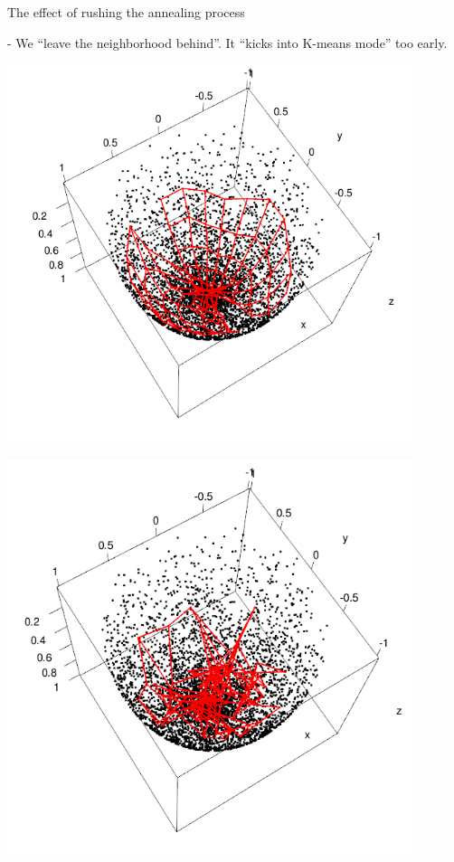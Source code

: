 \begin{frame}{The effect of rushing the annealing process}


- We ``leave the neighborhood behind''. It ``kicks into K-means mode'' too early.

\begin{minipage}{0.45\textwidth}
\begin{center}
	\includegraphics[width=0.9\textwidth]{img/3-bowlS2-2}
\end{center}
\end{minipage}
\begin{minipage}{0.45\textwidth}
\begin{center}
	\includegraphics[width=0.9\textwidth]{img/3-bowlS2-1}
\end{center}
\end{minipage}

\end{frame}

